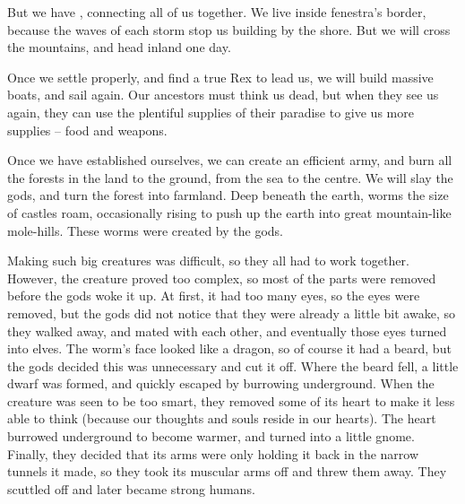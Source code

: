 \begin{multicols}{2}
\begin{exampletext}
  But we have , connecting all of us together.
  We live inside \gls{fenestra}'s border, because the waves of each \gls{storm} stop us building by the shore.
  But we will cross the mountains, and head inland one day.

  Once we settle properly, and find a true Rex to lead us, we will build massive boats, and sail again.
  Our ancestors must think us dead, but when they see us again, they can use the plentiful supplies of their paradise to give us more supplies -- food and weapons.

  Once we have established ourselves, we can create an efficient army, and burn all the forests in the land to the ground, from the sea to the centre.
  We will slay the gods, and turn the forest into farmland.
\else
  \noindent
  Deep beneath the earth, worms the size of castles roam, occasionally rising to push up the earth into great mountain-like mole-hills.
  These worms were created by the gods.

  Making such big creatures was difficult, so they all had to work together.
  However, the creature proved too complex, so most of the parts were removed before the gods woke it up.
  At first, it had too many eyes, so the eyes were removed, but the gods did not notice that they were already a little bit awake, so they walked away, and mated with each other, and eventually those eyes turned into elves.
  The worm's face looked like a dragon, so of course it had a beard, but the gods decided this was unnecessary and cut it off.
  Where the beard fell, a little dwarf was formed, and quickly escaped by burrowing underground.
  When the creature was seen to be too smart, they removed some of its heart to make it less able to think (because our thoughts and souls reside in our hearts).
  The heart burrowed underground to become warmer, and turned into a little gnome.
  Finally, they decided that its arms were only holding it back in the narrow tunnels it made, so they took its muscular arms off and threw them away.
  They scuttled off and later became strong humans.


\end{exampletext}
\end{multicols}
